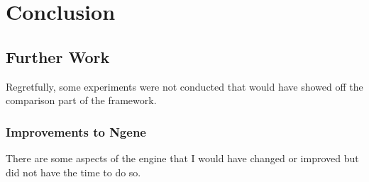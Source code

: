 \section{Conclusion}

\subsection{Further Work}

Regretfully, some experiments were not conducted that would have showed off the comparison part of the framework.

\subsubsection{Improvements to Ngene}
\label{sec:improvements}
There are some aspects of the engine that I would have changed or improved but did not have the time to do so.

